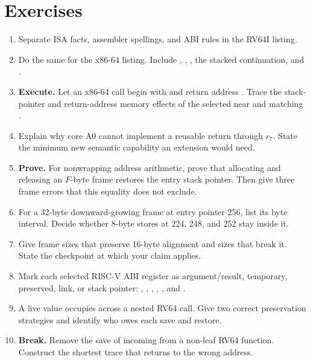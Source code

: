 \section{Exercises}

\begin{enumerate}
\item Separate ISA facts, assembler spellings, and ABI rules in the RV64I
 listing.

\item Do the same for the x86-64 listing. Include , ,
, the stacked continuation, and .

\item \textbf{Execute.} Let an x86-64 call begin with  and
return address . Trace the stack-pointer and return-address
memory effects of the selected near  and matching .

\item Explain why core A0 cannot implement a reusable return through \(r_7\).
State the minimum new semantic capability an extension would need.

\item \textbf{Prove.} For nonwrapping address arithmetic, prove that allocating
and releasing an \(F\)-byte frame restores the entry stack pointer. Then give
three frame errors that this equality does not exclude.

\item For a 32-byte downward-growing frame at entry pointer 256, list its byte
interval. Decide whether 8-byte stores at 224, 248, and 252 stay inside it.

\item Give frame sizes that preserve 16-byte alignment and sizes that break
it. State the checkpoint at which your claim applies.

\item Mark each selected RISC-V ABI register as argument/result, temporary,
preserved, link, or stack pointer: , , ,
, , and .

\item A live value occupies  across a nested RV64 call. Give two
correct preservation strategies and identify who owes each save and restore.

\item \textbf{Break.} Remove the save of incoming  from a non-leaf
RV64 function. Construct the shortest trace that returns to the wrong address.


\end{enumerate}
